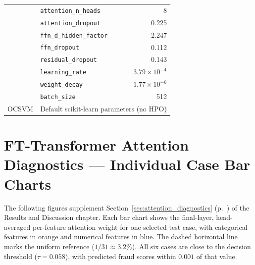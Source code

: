 \begin{minipage}{\linewidth}
\begin{tabular}{l l r}
  & \texttt{attention\_n\_heads} & 8 \\
  & \texttt{attention\_dropout} & 0.225 \\
  & \texttt{ffn\_d\_hidden\_factor} & 2.247 \\
  & \texttt{ffn\_dropout} & 0.112 \\
  & \texttt{residual\_dropout} & 0.143 \\
  & \texttt{learning\_rate} & $3.79 \times 10^{-4}$ \\
  & \texttt{weight\_decay} & $1.77 \times 10^{-6}$ \\
  & \texttt{batch\_size} & 512 \\
\midrule
OCSVM & \multicolumn{2}{l}{Default scikit-learn parameters (no HPO)} \\
\bottomrule
\end{tabular}
\end{minipage}\par\medskip

\clearpage

\section{FT-Transformer Attention Diagnostics --- Individual Case Bar Charts}
\label{appendixB}

The following figures supplement Section~\ref{sec:attention_diagnostics} (p.~\pageref{sec:attention_diagnostics}) of the Results and Discussion chapter. Each bar chart shows the final-layer, head-averaged per-feature attention weight for one selected test case, with categorical features in orange and numerical features in blue. The dashed horizontal line marks the uniform reference ($1/31 \approx 3.2\%$). All six cases are close to the decision threshold ($\tau = 0.058$), with predicted fraud scores within $0.001$ of that value.

